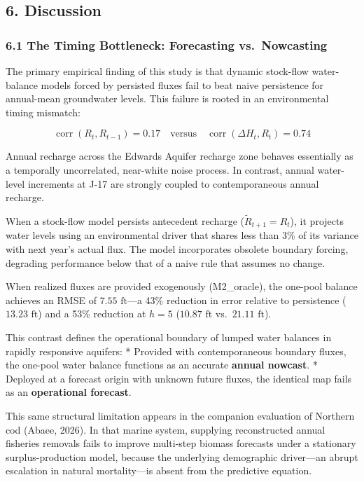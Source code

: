 \documentclass[11pt]{article}
\begin{document}
\subsection{6. Discussion}\label{discussion}

\subsubsection{6.1 The Timing Bottleneck: Forecasting
vs.~Nowcasting}\label{the-timing-bottleneck-forecasting-vs.-nowcasting}

The primary empirical finding of this study is that dynamic stock-flow
water-balance models forced by persisted fluxes fail to beat naive
persistence for annual-mean groundwater levels. This failure is rooted
in an environmental timing mismatch:

\[\operatorname{corr}(R_t, R_{t-1}) = 0.17 \quad \text{versus} \quad \operatorname{corr}(\Delta H_t, R_t) = 0.74\]

Annual recharge across the Edwards Aquifer recharge zone behaves
essentially as a temporally uncorrelated, near-white noise process. In
contrast, annual water-level increments at J-17 are strongly coupled to
contemporaneous annual recharge.

When a stock-flow model persists antecedent recharge
(\(\tilde{R}_{t+1} = R_t\)), it projects water levels using an
environmental driver that shares less than 3\% of its variance with next
year's actual flux. The model incorporates obsolete boundary forcing,
degrading performance below that of a naive rule that assumes no change.

When realized fluxes are provided exogenously (M2\_oracle), the one-pool
balance achieves an RMSE of \(7.55\text{ ft}\)---a 43\% reduction in
error relative to persistence (\(13.23\text{ ft}\)) and a 53\% reduction
at \(h=5\) (\(10.87\text{ ft}\) vs.~\(21.11\text{ ft}\)).

This contrast defines the operational boundary of lumped water balances
in rapidly responsive aquifers: * Provided with contemporaneous boundary
fluxes, the one-pool water balance functions as an accurate
\textbf{annual nowcast}. * Deployed at a forecast origin with unknown
future fluxes, the identical map fails as an \textbf{operational
forecast}.

This same structural limitation appears in the companion evaluation of
Northern cod (Abaee, 2026). In that marine system, supplying
reconstructed annual fisheries removals fails to improve multi-step
biomass forecasts under a stationary surplus-production model, because
the underlying demographic driver---an abrupt escalation in natural
mortality---is absent from the predictive equation.
\end{document}
